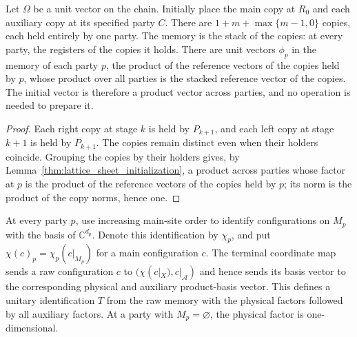 \begin{lemma}
    \label{thm:chain_initial_copies}
    \leanok
    Let $\Omega$ be a unit vector on the chain. Initially place the main
    copy at $R_0$ and each auxiliary copy at its specified party $C$.
    There are $1+m+\max\{m-1,0\}$ copies, each held entirely by one
    party. The memory is the stack of the copies: at every party, the
    registers of the copies it holds. There are unit vectors $\phi_p$
    in the memory of each party $p$, the product of the reference
    vectors of the copies held by $p$, whose product over all parties is
    the stacked reference vector of the copies. The initial vector is
    therefore a product vector across parties, and no operation is
    needed to prepare it.
\end{lemma}
\begin{proof}
    \leanok
    Each right copy at stage $k$ is held by $P_{k+1}$, and each left
    copy at stage $k+1$ is held by $P_{k+1}$. The copies remain
    distinct even when their holders coincide. Grouping the copies
    by their holders gives, by
    Lemma~\ref{thm:lattice_sheet_initialization}, a product across
    parties whose factor at $p$ is the product of the reference vectors
    of the copies held by $p$; its norm is the product of the copy
    norms, hence one.
\end{proof}

\begin{definition}
    \label{def:chain_terminal_coordinates}
    \leanok
    At every party $p$, use increasing main-site order to identify
    configurations on $M_p$ with the basis of $\mathbb C^{d_p}$.
    Denote this identification by $\chi_p$, and put
    $\chi(c)_p=\chi_p(c|_{M_p})$ for a main configuration $c$.
    The terminal coordinate map sends a raw configuration $c$ to
    $(\chi(c|_X),c|_{\mathcal A})$ and hence sends its basis vector to
    the corresponding physical and auxiliary product-basis vector.
    This defines a unitary identification $T$ from the raw
    memory with the physical factors followed by all auxiliary factors.
    At a party with $M_p=\varnothing$, the physical factor is
    one-dimensional.
\end{definition}

